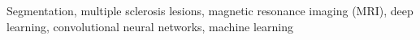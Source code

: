 \begin{abstract}


\end{abstract}

\begin{IEEEkeywords}
Segmentation, multiple sclerosis lesions, magnetic resonance imaging (MRI), deep
learning, convolutional neural networks, machine learning 
\end{IEEEkeywords}
